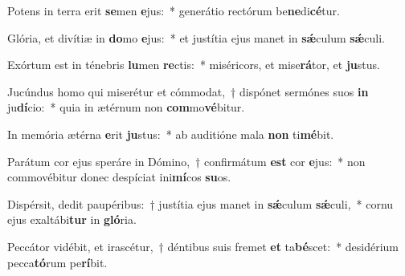﻿\item Potens in terra erit \textbf{se}men \textbf{e}jus:~* generátio rectórum be\textbf{ne}di\textbf{cé}tur.

\item Glória, et divítiæ in \textbf{do}mo \textbf{e}jus:~* et justítia ejus manet in \textbf{sǽ}culum \textbf{sǽ}culi.

\item Exórtum est in ténebris \textbf{lu}men \textbf{re}ctis:~* miséricors, et mise\textbf{rá}tor, et \textbf{ju}stus.

\item Jucúndus homo qui miserétur et cómmodat,~† dispónet sermónes suos \textbf{in} ju\textbf{dí}cio:~* quia in ætérnum non \textbf{com}mo\textbf{vé}bitur.

\item In memória ætérna \textbf{e}rit \textbf{ju}stus:~* ab auditióne mala \textbf{non} ti\textbf{mé}bit.

\item Parátum cor ejus speráre in Dómino,~† confirmátum \textbf{est} cor \textbf{e}jus:~* non commovébitur donec despíciat ini\textbf{mí}cos \textbf{su}os.

\item Dispérsit, dedit paupéribus:~† justítia ejus manet in \textbf{sǽ}culum \textbf{sǽ}culi,~* cornu ejus exaltábi\textbf{tur} in \textbf{gló}ria.

\item Peccátor vidébit, et irascétur,~† déntibus suis fremet \textbf{et} ta\textbf{bé}scet:~* desidérium pecca\textbf{tó}rum pe\textbf{rí}bit.